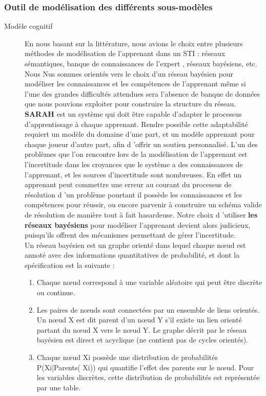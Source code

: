\subsubsection{Outil de modélisation des différents sous-modèles}
\begin{description}
    \item[Modèle cognitif] 
    En nous basant sur la littérature\cite{carole_2008}\cite{extensibe_student_modeling}, nous avions le choix entre plusieurs méthodes de modélisation de l'apprenant dans un STI : réseaux sémantiques, banque de connaissances de l'expert , réseaux bayésiens, etc. Nous Nus sommes orientés vers le choix d'un réseau bayésien pour modéliser les connaissances et les compétences de l'apprenant même si l'une des grandes difficultés attendues sera l'absence de banque de données que nous pouvions exploiter pour construire la structure du réseau.\\
\textbf{SARAH} est un système qui doit être capable d'adapter le processus d'apprentissage à chaque apprenant. Rendre possible cette adaptabilité requiert un modèle du domaine d'une part, et un modèle apprenant pour chaque joueur d'autre part, afin d 'offrir un soutien personnalisé. L'un des problèmes que l'on rencontre lors de la modélisation de l'apprenant est l'incertitude dans les croyances que le système a des connaissances de l'apprenant, et les sources d'incertitude sont nombreuses. En effet un apprenant peut commettre une erreur au courant du processus de résolution d 'un problème pourtant il possède les connaissances et les compétences pour réussir, ou encore parvenir à construire un schéma valide de résolution de manière tout à fait hasardeuse. Notre choix d 'utiliser \textbf{les réseaux bayésiens} pour modéliser l'apprenant devient alors judicieux, puisqu'ils offrent des mécanismes permettant de gérer l'incertitude. \\
Un réseau bayésien est un graphe orienté dans lequel chaque nœud est annoté avec des informations quantitatives de probabilité, et dont la spécification est la suivante  :
\begin{enumerate}
\item Chaque nœud correspond à une variable aléatoire qui peut être discrète ou continue.
\item  Les paires de nœuds sont connectées par un ensemble de liens orientés. Un nœud X est dit parent d'un nœud Y s'il existe un lien orienté partant du nœud X vers le nœud Y. Le graphe décrit par le réseau bayésien est direct et acyclique (ne contient pas de cycles orientés).
\item  Chaque nœud Xi possède une distribution de probabilités P(Xi|Parents( Xi)) qui quantifie l'effet des parents sur le nœud. Pour les variables discrètes, cette distribution de probabilités est représentée par une table. 
\end{enumerate}
 


\end{description}

